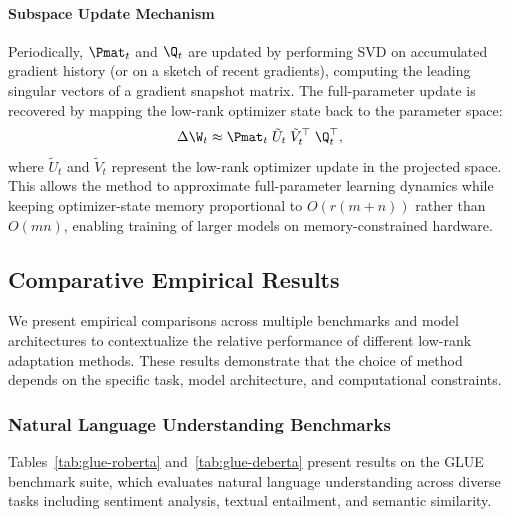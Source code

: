 \paragraph{Subspace Update Mechanism}
Periodically, $\Pmat_t$ and $\Q_t$ are updated by performing SVD on accumulated gradient history (or on a sketch of recent gradients), computing the leading singular vectors of a gradient snapshot matrix. The full-parameter update is recovered by mapping the low-rank optimizer state back to the parameter space:
\begin{equation}
  \Delta \W_t \approx \Pmat_t \;\tilde{U}_t\;\tilde{V}_t^\top\; \Q_t^\top,
\end{equation}
where $\tilde{U}_t$ and $\tilde{V}_t$ represent the low-rank optimizer update in the projected space. This allows the method to approximate full-parameter learning dynamics while keeping optimizer-state memory proportional to $O(r(m+n))$ rather than $O(mn)$, enabling training of larger models on memory-constrained hardware.

\subsection{Comparative Empirical Results}
\label{subsec:comparison}

We present empirical comparisons across multiple benchmarks and model architectures to contextualize the relative performance of different low-rank adaptation methods. These results demonstrate that the choice of method depends on the specific task, model architecture, and computational constraints.

\subsubsection{Natural Language Understanding Benchmarks}

Tables~\ref{tab:glue-roberta} and~\ref{tab:glue-deberta} present results on the GLUE benchmark suite, which evaluates natural language understanding across diverse tasks including sentiment analysis, textual entailment, and semantic similarity.


